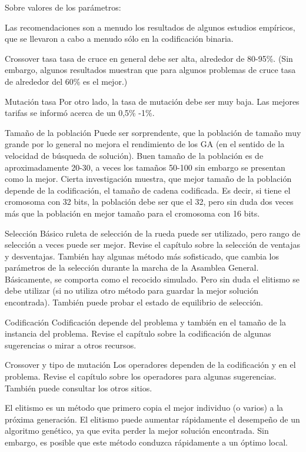 \documentclass[12pt]{article}
\begin{document}
Sobre valores de los parámetros:


Las recomendaciones son a menudo los resultados de algunos estudios empíricos, que se llevaron a cabo a menudo sólo en la codificación binaria.

Crossover tasa
tasa de cruce en general debe ser alta, alrededor de 80-95\%. (Sin embargo, algunos resultados muestran que para algunos problemas de cruce tasa de alrededor del 60\% es el mejor.)

Mutación tasa
Por otro lado, la tasa de mutación debe ser muy baja. Las mejores tarifas se informó acerca de un 0,5\% -1\%.

Tamaño de la población
Puede ser sorprendente, que la población de tamaño muy grande por lo general no mejora el rendimiento de los GA (en el sentido de la velocidad de búsqueda de solución). Buen tamaño de la población es de aproximadamente 20-30, a veces los tamaños 50-100 sin embargo se presentan como la mejor. Cierta investigación muestra, que mejor tamaño de la población depende de la codificación, el tamaño de cadena codificada. Es decir, si tiene el cromosoma con 32 bits, la población debe ser que el 32, pero sin duda dos veces más que la población en mejor tamaño para el cromosoma con 16 bits.

Selección
Básico ruleta de selección de la rueda puede ser utilizado, pero rango de selección a veces puede ser mejor. Revise el capítulo sobre la selección de ventajas y desventajas. También hay algunas método más sofisticado, que cambia los parámetros de la selección durante la marcha de la Asamblea General. Básicamente, se comporta como el recocido simulado. Pero sin duda el elitismo se debe utilizar (si no utiliza otro método para guardar la mejor solución encontrada). También puede probar el estado de equilibrio de selección.

Codificación
Codificación depende del problema y también en el tamaño de la instancia del problema. Revise el capítulo sobre la codificación de algunas sugerencias o mirar a otros recursos.

Crossover y tipo de mutación
Los operadores dependen de la codificación y en el problema. Revise el capítulo sobre los operadores para algunas sugerencias. También puede consultar los otros sitios.

El elitismo es un método que primero copia el mejor individuo (o varios) a la
próxima generación. El elitismo puede aumentar rápidamente el desempeño de un
algoritmo genético, ya que evita perder la mejor solución encontrada. Sin embargo,
es posible que este método conduzca rápidamente a un óptimo local.
\end{document}
